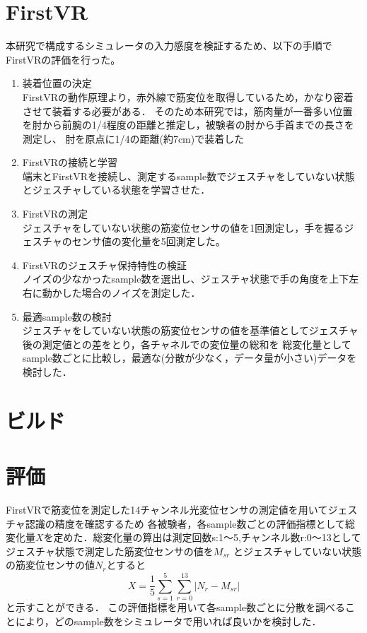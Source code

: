 \documentclass{ltjsreport}
\begin{document}
	\section{FirstVR}
		本研究で構成するシミュレータの入力感度を検証するため、以下の手順でFirstVRの評価を行った。
			\begin{enumerate}
				\item 装着位置の決定\\
					FirstVRの動作原理より，赤外線で筋変位を取得しているため，かなり密着させて装着する必要がある．
					そのため本研究では，筋肉量が一番多い位置を肘から前腕の1/4程度の距離と推定し，被験者の肘から手首までの長さを測定し、
					肘を原点に1/4の距離(約7cm)で装着した
				\item FirstVRの接続と学習\\
					端末とFirstVRを接続し、測定するsample数でジェスチャをしていない状態とジェスチャしている状態を学習させた．
				\item FirstVRの測定\\
					ジェスチャをしていない状態の筋変位センサの値を1回測定し，手を握るジェスチャのセンサ値の変化量を5回測定した。
				\item FirstVRのジェスチャ保持特性の検証\\
					ノイズの少なかったsample数を選出し、ジェスチャ状態で手の角度を上下左右に動かした場合のノイズを測定した．
				\item 最適sample数の検討\\
				ジェスチャをしていない状態の筋変位センサの値を基準値としてジェスチャ後の測定値との差をとり，各チャネルでの変位量の総和を
					総変化量としてsample数ごとに比較し，最適な(分散が少なく，データ量が小さい)データを検討した．
			\end{enumerate}
	\section{ビルド}
	\section{評価}
		FirstVRで筋変位を測定した14チャンネル光変位センサの測定値を用いてジェスチャ認識の精度を確認するため
		各被験者，各sample数ごとの評価指標として総変化量$X$を定めた．総変化量の算出は測定回数s:1～5,チャンネル数r:0～13としてジェスチャ状態で測定した筋変位センサの値を$M_{{s}{r}}$
		とジェスチャしていない状態の筋変位センサの値$N_{r}$とすると
		\begin{equation}
			X = \frac{1}{5} \sum_{s = 1}^{5} \sum_{r = 0}^{13} |N_{r} - M_{{s}{r}}|
		\end{equation}
		と示すことができる．
		この評価指標を用いて各sample数ごとに分散を調べることにより，どのsample数をシミュレータで用いれば良いかを検討した．
		
\end{document}
